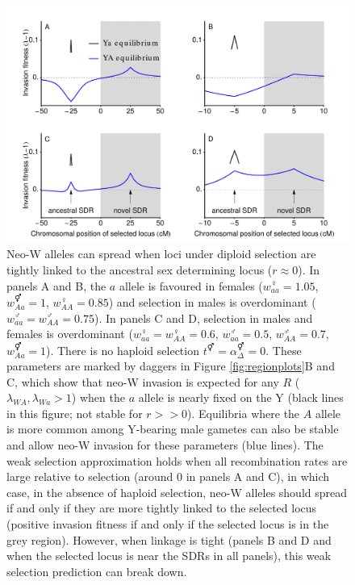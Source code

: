 \documentclass[12pt]{article}
\begin{document}
\begin{figure}[!h]
\centering
\centerline{\includegraphics[width=\linewidth]{PositionPlot_Overdominance}}
\caption{
Neo-W alleles can spread when loci under diploid selection are tightly linked to the ancestral sex determining locus ($r\approx0$). 
In panels A and B, the $a$ allele is favoured in females ($w_{aa}^\female=1.05$, $w_{Aa}^\Hermaphrodite=1$, $w_{AA}^\female=0.85$) and selection in males is overdominant ($w_{aa}^\male=w_{AA}^\male=0.75$).
In panels C and D, selection in males and females is overdominant ($w_{aa}^\female=w_{AA}^\female=0.6$, $w_{aa}^\male=0.5$, $w_{AA}^\male=0.7$, $w_{Aa}^\Hermaphrodite=1$).
There is no haploid selection $t^\Hermaphrodite = \alpha^\Hermaphrodite_\Delta = 0$.
These parameters are marked by daggers in Figure \ref{fig:regionplots}B and C, which show that neo-W invasion is expected for any $R$ ($\lambda_{WA},\lambda_{Wa}>1$) when the $a$ allele is nearly fixed on the Y (black lines in this figure; not stable for $r>>0$). 
Equilibria where the $A$ allele is more common among Y-bearing male gametes can also be stable and allow neo-W invasion for these parameters (blue lines). 
The weak selection approximation holds when all recombination rates are large relative to selection (around 0 in panels A and C), in which case, in the absence of haploid selection, neo-W alleles should spread if and only if they are more tightly linked to the selected locus (positive invasion fitness if and only if the selected locus is in the grey region). 
However, when linkage is tight (panels B and D and when the selected locus is near the SDRs in all panels), this weak selection prediction can break down. 
}
\label{fig:positionOverdominance}
\end{figure}
\end{document}
